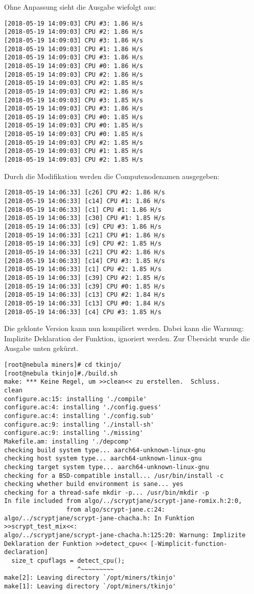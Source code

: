 Ohne Anpassung sieht die Ausgabe wiefolgt aus:
\begin{lstlisting}
[2018-05-19 14:09:03] CPU #3: 1.86 H/s
[2018-05-19 14:09:03] CPU #2: 1.86 H/s
[2018-05-19 14:09:03] CPU #3: 1.86 H/s
[2018-05-19 14:09:03] CPU #1: 1.86 H/s
[2018-05-19 14:09:03] CPU #3: 1.86 H/s
[2018-05-19 14:09:03] CPU #0: 1.86 H/s
[2018-05-19 14:09:03] CPU #2: 1.86 H/s
[2018-05-19 14:09:03] CPU #2: 1.85 H/s
[2018-05-19 14:09:03] CPU #2: 1.86 H/s
[2018-05-19 14:09:03] CPU #3: 1.85 H/s
[2018-05-19 14:09:03] CPU #3: 1.86 H/s
[2018-05-19 14:09:03] CPU #0: 1.85 H/s
[2018-05-19 14:09:03] CPU #0: 1.85 H/s
[2018-05-19 14:09:03] CPU #0: 1.85 H/s
[2018-05-19 14:09:03] CPU #2: 1.85 H/s
[2018-05-19 14:09:03] CPU #1: 1.85 H/s
[2018-05-19 14:09:03] CPU #2: 1.85 H/s
\end{lstlisting}
Durch die Modifikation werden die Computenodenamen ausgegeben:
\begin{lstlisting}
[2018-05-19 14:06:33] [c26] CPU #2: 1.86 H/s
[2018-05-19 14:06:33] [c14] CPU #1: 1.86 H/s
[2018-05-19 14:06:33] [c1] CPU #1: 1.86 H/s
[2018-05-19 14:06:33] [c30] CPU #1: 1.85 H/s
[2018-05-19 14:06:33] [c9] CPU #3: 1.86 H/s
[2018-05-19 14:06:33] [c21] CPU #1: 1.86 H/s
[2018-05-19 14:06:33] [c9] CPU #2: 1.85 H/s
[2018-05-19 14:06:33] [c21] CPU #2: 1.86 H/s
[2018-05-19 14:06:33] [c14] CPU #3: 1.85 H/s
[2018-05-19 14:06:33] [c1] CPU #2: 1.85 H/s
[2018-05-19 14:06:33] [c39] CPU #2: 1.85 H/s
[2018-05-19 14:06:33] [c39] CPU #0: 1.85 H/s
[2018-05-19 14:06:33] [c13] CPU #2: 1.84 H/s
[2018-05-19 14:06:33] [c13] CPU #0: 1.84 H/s
[2018-05-19 14:06:33] [c4] CPU #3: 1.85 H/s
\end{lstlisting}
Die geklonte Version kann nun kompiliert werden. Dabei kann die Warnung: Implizite Deklaration der Funktion, ignoriert werden. Zur Übersicht wurde die Ausgabe unten gekürzt.
\begin{lstlisting}
[root@nebula miners]# cd tkinjo/
[root@nebula tkinjo]#./build.sh
make: *** Keine Regel, um >>clean<< zu erstellen.  Schluss.
clean
configure.ac:15: installing './compile'
configure.ac:4: installing './config.guess'
configure.ac:4: installing './config.sub'
configure.ac:9: installing './install-sh'
configure.ac:9: installing './missing'
Makefile.am: installing './depcomp'
checking build system type... aarch64-unknown-linux-gnu
checking host system type... aarch64-unknown-linux-gnu
checking target system type... aarch64-unknown-linux-gnu
checking for a BSD-compatible install... /usr/bin/install -c
checking whether build environment is sane... yes
checking for a thread-safe mkdir -p... /usr/bin/mkdir -p
In file included from algo/../scryptjane/scrypt-jane-romix.h:2:0,
                 from algo/scrypt-jane.c:24:
algo/../scryptjane/scrypt-jane-chacha.h: In Funktion >>scrypt_test_mix<<:
algo/../scryptjane/scrypt-jane-chacha.h:125:20: Warnung: Implizite Deklaration der Funktion >>detect_cpu<< [-Wimplicit-function-declaration]
  size_t cpuflags = detect_cpu();
                    ^~~~~~~~~~
make[2]: Leaving directory `/opt/miners/tkinjo'
make[1]: Leaving directory `/opt/miners/tkinjo'
\end{lstlisting}
 
